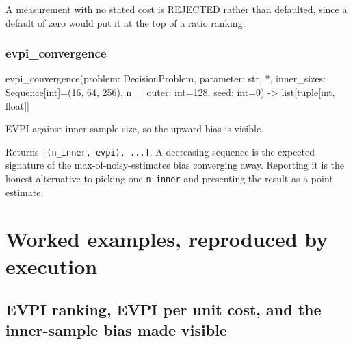 \documentclass[10pt,a4paper,twoside]{report}
\begin{document}
A measurement with no stated cost is REJECTED rather than defaulted, since a default of zero would put it at the top of a ratio ranking.

\subsubsection*{evpi\_convergence}

\begin{verbatimsmall}
evpi_convergence(problem: DecisionProblem, parameter: str, *, inner_sizes: Sequence[int]=(16, 64, 256), n_
    \ outer: int=128, seed: int=0) -> list[tuple[int, float]]
\end{verbatimsmall}

EVPI against inner sample size, so the upward bias is visible.

Returns \texttt{[(n\_inner, evpi), ...]}. A decreasing sequence is the expected signature of the max-of-noisy-estimates bias converging away. Reporting it is the honest alternative to picking one \texttt{n\_inner} and presenting the result as a point estimate.

\section{Worked examples, reproduced by execution}

\subsection*{EVPI ranking, EVPI per unit cost, and the inner-sample bias made visible}
\end{document}
